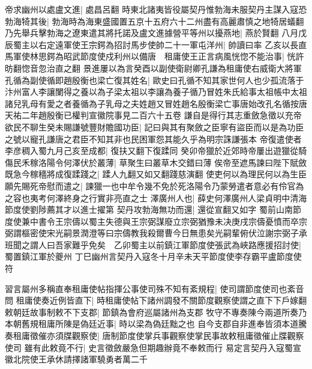 帝求幽州以處盧文進|{
	處昌呂翻}
時東北諸夷皆役屬契丹惟勃海未服契丹主謀入寇恐勃海犄其後|{
	勃海時為海東盛國置五京十五府六十二州盡有高麗肅慎之地犄居蟻翻}
乃先舉兵擊勃海之遼東遣其將托諾及盧文進據營平等州以擾燕地|{
	燕於賢翻}
八月戊辰蜀主以右定遠軍使王宗鍔為招討馬步使帥二十一軍屯洋州|{
	帥讀曰率}
乙亥以長直馬軍使林思鍔為昭武節度使戍利州以備唐　租庸使王正言病風恍惚不能治事|{
	恍許昉翻惚音忽治直之翻}
景進屢以為言癸酉以副使衛尉卿孔謙為租庸使右威衛大將軍孔循為副使循即趙殷衡也梁亡復其姓名|{
	歐史曰孔循不知其家世何人也少孤流落于汴州富人李讓闌得之養以為子梁太祖以李讓為養子循乃冒姓朱氏給事太祖帳中太祖諸兒乳母有愛之者養循為子乳母之夫姓趙又冒姓趙名殷衡梁亡事唐始改孔名循按唐天祐二年趙殷衡已權判宣徽院事見二百六十五卷}
謙自是得行其志重斂急徵以充帝欲民不聊生癸未賜謙號豐財贍國功臣|{
	記曰與其有聚斂之臣寧有盜臣而以是為功臣之號以寵孔謙唐之君臣不知其非也民困軍怨其能久乎為明宗誅謙張本}
帝復遣使者李彦稠入蜀九月己亥至成都|{
	復扶又翻下復蹂同}
癸卯帝獵於近郊時帝屢出遊獵從騎傷民禾稼洛陽令何澤伏於叢薄|{
	草聚生曰叢草木交錯曰薄}
俟帝至遮馬諫曰陛下賦斂既急今稼穡將成復蹂踐之|{
	蹂人九翻又如又翻踐慈演翻}
使吏何以為理民何以為生臣願先賜死帝慰而遣之|{
	諫獵一也中牟令幾不免於死洛陽令乃蒙勞遣者意必有伶官為之容也夷考何澤終身之行實非亮直之士}
澤廣州人也|{
	薛史何澤廣州人梁貞明中清海節度使劉陟薦其才以進士擢第}
契丹攻勃海無功而還|{
	還從宣翻又如字}
蜀前山南節度使兼中書令王宗儔以蜀主失德與王宗弼謀廢立宗弼猶豫未决庚戌宗儔憂憤而卒宗弼謂樞密使宋光嗣景潤澄等曰宗儔教我殺爾曹今日無患矣光嗣輩俯伏泣謝宗弼子承班聞之謂人曰吾家難乎免矣　乙卯蜀主以前鎮江軍節度使張武為峽路應援招討使|{
	蜀置鎮江軍於夔州}
丁巳幽州言契丹入寇冬十月辛未天平節度使李存霸平盧節度使符

習言屬州多稱直奉租庸使帖指揮公事使司殊不知有紊規程|{
	使司謂節度使司也紊音問}
租庸使奏近例皆直下|{
	時租庸使帖下諸州調發不關節度觀察使謂之直下下戶嫁翻}
敕朝廷故事制敕不下支郡|{
	節鎮為會府巡屬諸州為支郡}
牧守不專奏陳今兩道所奏乃本朝舊規租庸所陳是偽廷近事|{
	時以梁為偽廷黜之也}
自今支郡自非進奉皆須本道騰奏租庸徵催亦須牒觀察使|{
	唐制節度使掌兵事觀察使掌民事故敕租庸徵催止牒觀察使司}
雖有此敕竟不行|{
	史言徵斂嚴急但期趣辦竟不奉敕而行}
易定言契丹入寇蜀宣徽北院使王承休請擇諸軍驍勇者萬二千

